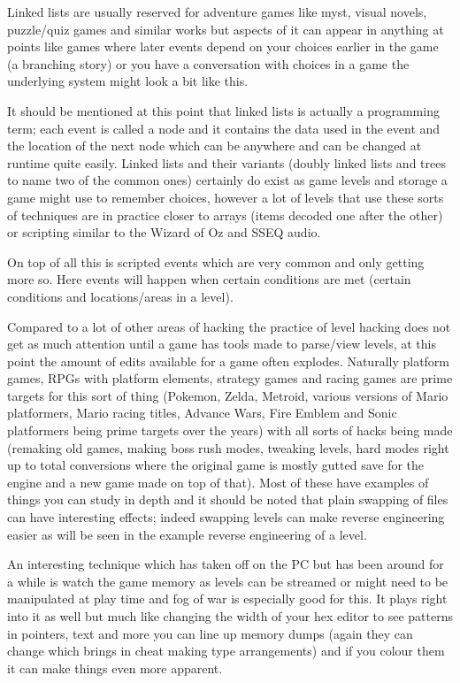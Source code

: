 \documentclass[
]{book}
\begin{document}
Linked lists are usually reserved for adventure games like myst, visual novels, puzzle/quiz games and similar works but aspects of it can appear in anything at points like games where later events depend on your choices earlier in the game (a branching story) or you have a conversation with choices in a game the underlying system might look a bit like this.

It should be mentioned at this point that linked lists is actually a programming term; each event is called a node and it contains the data used in the event and the location of the next node which can be anywhere and can be changed at runtime quite easily. Linked lists and their variants (doubly linked lists and trees to name two of the common ones) certainly do exist as game levels and storage a game might use to remember choices, however a lot of levels that use these sorts of techniques are in practice closer to arrays (items decoded one after the other) or scripting similar to the Wizard of Oz and SSEQ audio.

On top of all this is scripted events which are very common and only getting more so. Here events will happen when certain conditions are met (certain conditions and locations/areas in a level).

Compared to a lot of other areas of hacking the practice of level hacking does not get as much attention until a game has tools made to parse/view levels, at this point the amount of edits available for a game often explodes. Naturally platform games, RPGs with platform elements, strategy games and racing games are prime targets for this sort of thing (Pokemon, Zelda, Metroid, various versions of Mario platformers, Mario racing titles, Advance Wars, Fire Emblem and Sonic platformers being prime targets over the years) with all sorts of hacks being made (remaking old games, making boss rush modes, tweaking levels, hard modes right up to total conversions where the original game is mostly gutted save for the engine and a new game made on top of that). Most of these have examples of things you can study in depth and it should be noted that plain swapping of files can have interesting effects; indeed swapping levels can make reverse engineering easier as will be seen in the example reverse engineering of a level.

An interesting technique which has taken off on the PC but has been around for a while is watch the game memory as levels can be streamed or might need to be manipulated at play time and fog of war is especially good for this. It plays right into it as well but much like changing the width of your hex editor to see patterns in pointers, text and more you can line up memory dumps (again they can change which brings in cheat making type arrangements) and if you colour them it can make things even more apparent.
\end{document}
